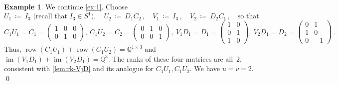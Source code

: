 \documentclass{lmcs}
\theoremstyle{definition}
\newtheorem{example}[thm]{Example}
\newcommand{\Hquad}{\hspace{0.5em}}
\DeclareMathOperator{\im}{im}
\DeclareMathOperator{\row}{row}
\newcommand{\Q}{\mathbb{Q}}
\begin{document}
\begin{example} \label{ex:2}
We continue \cref{ex:1}.
Choose
\[ 
 U_1 \ \coloneqq \ I_3 \text{ (recall that $I_3 \in S^1$)}, \quad 
 U_2 \ \coloneqq \ D_1 C_2\,,\quad
 V_1 \ \coloneqq \ I_3\,,\quad
 V_2 \ \coloneqq \ D_2 C_1\,, \quad \text{so that}
\]
\[
 C_1 U_1  =  C_1  =  \left(\begin{smallmatrix}1&0&0\\0&1&0\end{smallmatrix}\right),\
 C_1 U_2  =  C_2  =  \left(\begin{smallmatrix}0&1&0\\0&0&1\end{smallmatrix}\right),\
 V_1 D_1  =  D_1  =  \left(\begin{smallmatrix}1&0\\0&1\\1&0\end{smallmatrix}\right),\
 V_2 D_1  =  D_2  =  \left(\begin{smallmatrix}0&1\\1&0\\0&-1\end{smallmatrix}\right)\,.
\]
Thus, $\row(C_1 U_1) + \row(C_1 U_2) = \Q^{1 \times 3}$ and $\im(V_1 D_1) + \im(V_2 D_1) = \Q^{3}$.
The ranks of these four matrices are all~$2$, consistent with \cref{lem:rk-VjD} and its analogue for $C_1 U_1, C_1 U_2$.
We have $u = v = 2$.
\qed
\end{example}

%
\end{document}

